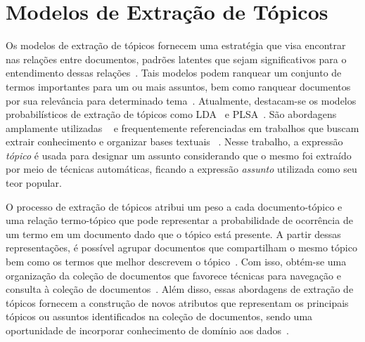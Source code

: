 
\section{Modelos de Extração de Tópicos}





Os modelos de extração de tópicos fornecem uma estratégia que visa encontrar nas relações entre documentos, padrões latentes que sejam significativos para o entendimento dessas relações~\cite{Wei2007}. Tais modelos podem ranquear um conjunto de termos importantes para um ou mais assuntos, bem como ranquear documentos por sua relevância para determinado tema~\cite{Faleiros2016,Xing2009}.
Atualmente, destacam-se os modelos probabilísticos de extração de tópicos como LDA~\cite{Blei2003} e PLSA~\cite{Hofmann1999}. São abordagens amplamente utilizadas ~\cite{DZhu20122} e frequentemente referenciadas em trabalhos que buscam extrair conhecimento e organizar bases textuais ~\cite{Aggarwal2018, OCallaghan2015, Steyvers2007}.  
%
%
Nesse trabalho, a expressão \textit{tópico} é usada para designar um assunto considerando que o mesmo foi extraído por meio de técnicas automáticas, ficando a expressão \textit{assunto} utilizada como seu teor popular. 

O processo de extração de tópicos atribui um peso a cada documento-tópico e uma relação termo-tópico que pode representar a probabilidade de ocorrência de um termo em um documento dado que o tópico está presente. A partir dessas representações, é possível agrupar documentos que compartilham o mesmo tópico bem como os termos que melhor descrevem o tópico~\cite{Aggarwal2018}. Com isso, obtém-se uma organização da coleção de documentos que favorece técnicas para navegação e consulta à coleção de documentos~\cite{Maracini2010}. 
% 
Além disso, essas abordagens de extração de tópicos fornecem a construção de novos atributos que representam os principais tópicos ou assuntos identificados na coleção de documentos, sendo uma oportunidade de incorporar conhecimento de domínio aos dados~\cite{Guyon2003}. 


